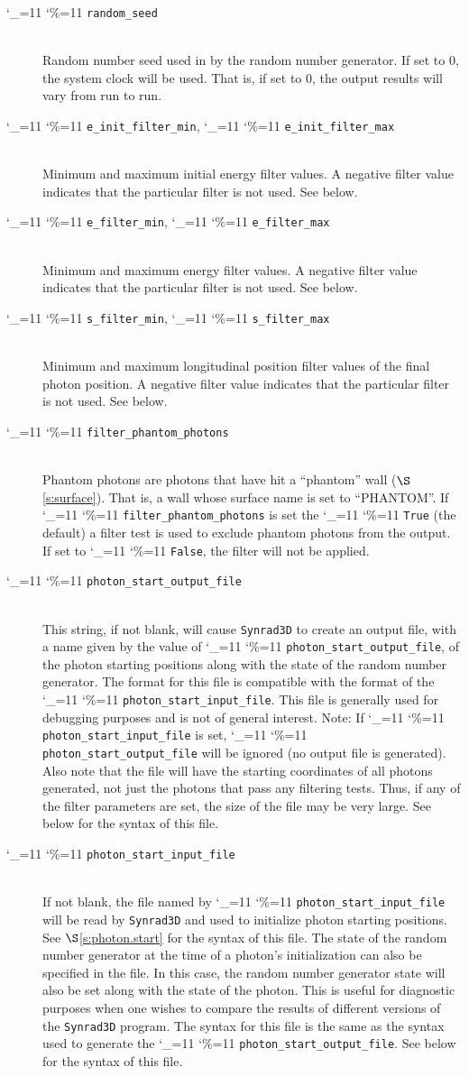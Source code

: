 \documentclass[11pt,openany]{report}
\newcommand{\sref}[1]{$\S$\ref{#1}}
\newcommand{\srthree}{\texttt{Synrad3D}\xspace}
\newcommand\ttcmd{\begingroup\catcode`\_=11 \catcode`\%=11 \dottcmd}
\newcommand\dottcmd[1]{\texttt{#1}\endgroup}
\newcommand{\vn}{\ttcmd}
\newcommand{\Newline}{\hfil \\}
\begin{document}
\begin{description}
  \item[\vn{random_seed}] \Newline
Random number seed used in by the random number generator. If set to 0, the system clock
will be used. That is, if set to 0, the output results will vary from run to run. 
  \item[\vn{e_init_filter_min}, \vn{e_init_filter_max}] \Newline
Minimum and maximum initial energy filter values. A negative filter value
indicates that the particular filter is not used. See below.
  \item[\vn{e_filter_min}, \vn{e_filter_max}] \Newline
Minimum and maximum energy filter values. A negative filter value
indicates that the particular filter is not used. See below.
  \item[\vn{s_filter_min}, \vn{s_filter_max}] \Newline
Minimum and maximum longitudinal position filter values of the final
photon position. A negative filter value indicates that the particular
filter is not used. See below.
  \item[\vn{filter_phantom_photons}] \Newline
Phantom photons are photons that have hit a ``phantom'' wall (\sref{s:surface}).  That is,
a wall whose surface name is set to ``PHANTOM''. If \vn{filter_phantom_photons} is set the
\vn{True} (the default) a filter test is used to exclude phantom photons from the output.
If set to \vn{False}, the filter will not be applied.
  \item[\vn{photon_start_output_file}] \Newline
This string, if not blank, will cause \srthree to create an output file, with a name given
by the value of \vn{photon_start_output_file}, of the photon starting positions along with
the state of the random number generator. The format for this file is compatible with the
format of the \vn{photon_start_input_file}. This file is generally used for debugging
purposes and is not of general interest. Note: If \vn{photon_start_input_file} is set,
\vn{photon_start_output_file} will be ignored (no output file is generated). Also note
that the file will have the starting coordinates of all photons generated, not just the
photons that pass any filtering tests. Thus, if any of the filter parameters are set, the
size of the file may be very large. See below for the syntax of this file.
  \item[\vn{photon_start_input_file}] \Newline
If not blank, the file named by \vn{photon_start_input_file} will be read by \srthree and
used to initialize photon starting positions. See \sref{s:photon.start} for the syntax of
this file.  The state of the random number generator at the time of a photon's
initialization can also be specified in the file. In this case, the random number
generator state will also be set along with the state of the photon. This is useful for
diagnostic purposes when one wishes to compare the results of different versions of the
\srthree program. The syntax for this file is the same as the syntax used to generate the
\vn{photon_start_output_file}. See below for the syntax of this file.


\end{description}
\end{document}
